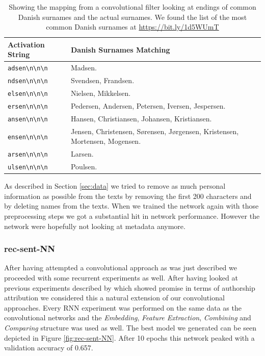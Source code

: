 \begin{table}
    \begin{tabular}{ll}
        \textbf{Activation String} & \textbf{Danish Surnames Matching} \\
        \hline
        \verb!adsen\n\n\n! & Madsen. \\
        \verb!ndsen\n\n\n! & Svendsen, Frandsen. \\
        \verb!elsen\n\n\n! & Nielsen, Mikkelsen. \\
        \verb!ersen\n\n\n! & Pedersen, Andersen, Petersen, Iversen, Jespersen. \\
        \verb!ansen\n\n\n! & Hansen, Christiansen, Johansen, Kristiansen. \\
        \verb!ensen\n\n\n! & Jensen, Christensen, S\o rensen, J\o rgensen, Kristensen,
                             Mortensen, Mogensen. \\
        \verb!arsen\n\n\n! & Larsen. \\
        \verb!ulsen\n\n\n! & Poulsen.
    \end{tabular}
    \caption{Showing the mapping from a convolutional filter looking at endings
        of common Danish surnames and the actual surnames. We found the list of
        the most common Danish surnames at \url{https://bit.ly/1d5WUmT}}
    \label{tab:name_features}
\end{table}

As described in Section \ref{sec:data} we tried to remove as much personal
information as possible from the texts by removing the first 200 characters and
by deleting names from the texts. When we trained the network again with those
preprocessing steps we got a substantial hit in network performance. However the
network were hopefully not looking at metadata anymore.


\subsubsection{\glsdesc{rec-sent-NN}}
\label{subsubsec:rec_sent_nn}

After having attempted a convolutional approach as was just described we
proceeded with some recurrent experiments as well. After having looked at
previous experiments described by \cite{qian:2018} which showed promise in
terms of authorship attribution we considered this a natural extension of
our convolutional approaches. Every \gls{RNN} experiment was performed on
the same data as the convolutional networks and the \textit{Embedding},
\textit{Feature Extraction}, \textit{Combining} and \textit{Comparing} structure
was used as well. The best model we generated can be seen depicted in Figure
\ref{fig:rec-sent-NN}. After 10 epochs this network peaked with a validation
accuracy of 0.657.

